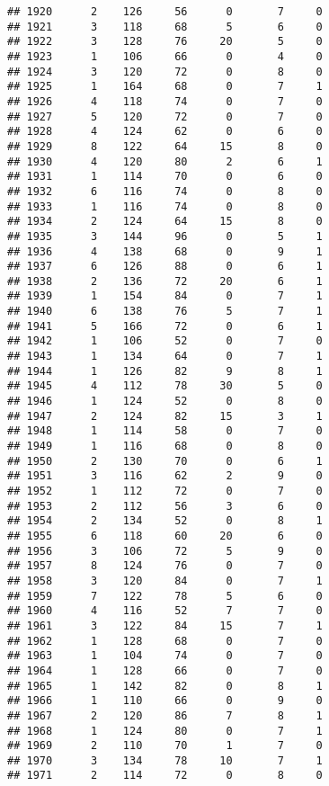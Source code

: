 \documentclass[
]{article}
\begin{document}
\begin{verbatim}
## 1920      2    126     56      0       7     0
## 1921      3    118     68      5       6     0
## 1922      3    128     76     20       5     0
## 1923      1    106     66      0       4     0
## 1924      3    120     72      0       8     0
## 1925      1    164     68      0       7     1
## 1926      4    118     74      0       7     0
## 1927      5    120     72      0       7     0
## 1928      4    124     62      0       6     0
## 1929      8    122     64     15       8     0
## 1930      4    120     80      2       6     1
## 1931      1    114     70      0       6     0
## 1932      6    116     74      0       8     0
## 1933      1    116     74      0       8     0
## 1934      2    124     64     15       8     0
## 1935      3    144     96      0       5     1
## 1936      4    138     68      0       9     1
## 1937      6    126     88      0       6     1
## 1938      2    136     72     20       6     1
## 1939      1    154     84      0       7     1
## 1940      6    138     76      5       7     1
## 1941      5    166     72      0       6     1
## 1942      1    106     52      0       7     0
## 1943      1    134     64      0       7     1
## 1944      1    126     82      9       8     1
## 1945      4    112     78     30       5     0
## 1946      1    124     52      0       8     0
## 1947      2    124     82     15       3     1
## 1948      1    114     58      0       7     0
## 1949      1    116     68      0       8     0
## 1950      2    130     70      0       6     1
## 1951      3    116     62      2       9     0
## 1952      1    112     72      0       7     0
## 1953      2    112     56      3       6     0
## 1954      2    134     52      0       8     1
## 1955      6    118     60     20       6     0
## 1956      3    106     72      5       9     0
## 1957      8    124     76      0       7     0
## 1958      3    120     84      0       7     1
## 1959      7    122     78      5       6     0
## 1960      4    116     52      7       7     0
## 1961      3    122     84     15       7     1
## 1962      1    128     68      0       7     0
## 1963      1    104     74      0       7     0
## 1964      1    128     66      0       7     0
## 1965      1    142     82      0       8     1
## 1966      1    110     66      0       9     0
## 1967      2    120     86      7       8     1
## 1968      1    124     80      0       7     1
## 1969      2    110     70      1       7     0
## 1970      3    134     78     10       7     1
## 1971      2    114     72      0       8     0

\end{verbatim}
\end{document}

